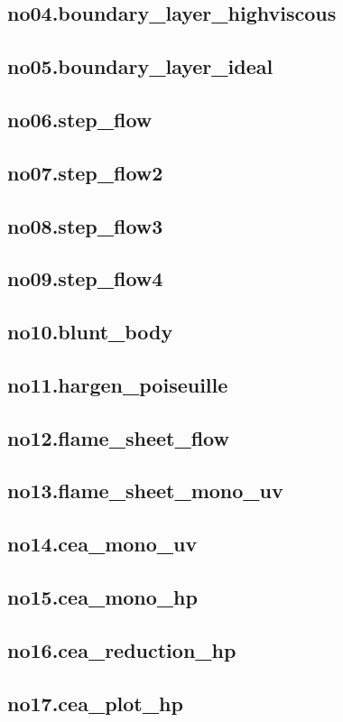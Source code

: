 \documentclass{jsarticle}
\begin{document}
\subsection{no04.boundary\_layer\_highviscous}%

\subsection{no05.boundary\_layer\_ideal}
\subsection{no06.step\_flow}
\subsection{no07.step\_flow2}
\subsection{no08.step\_flow3}
\subsection{no09.step\_flow4}
\subsection{no10.blunt\_body}
\subsection{no11.hargen\_poiseuille}
\subsection{no12.flame\_sheet\_flow}
\subsection{no13.flame\_sheet\_mono\_uv}
\subsection{no14.cea\_mono\_uv}
\subsection{no15.cea\_mono\_hp}
\subsection{no16.cea\_reduction\_hp}
\subsection{no17.cea\_plot\_hp}
\end{document}
